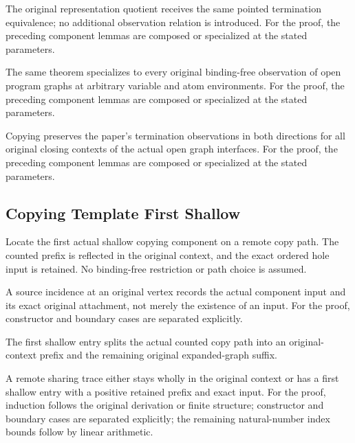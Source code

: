 The original representation quotient receives the same pointed termination equivalence; no additional observation relation is introduced.
For the proof, the preceding component lemmas are composed or specialized at the stated parameters.
\par{}

The same theorem specializes to every original binding-free observation of open program graphs at arbitrary variable and atom environments.
For the proof, the preceding component lemmas are composed or specialized at the stated parameters.
\par{}

Copying preserves the paper's termination observations in both directions for all original closing contexts of the actual open graph interfaces.
For the proof, the preceding component lemmas are composed or specialized at the stated parameters.
\par{}

\subsection{Copying Template First Shallow}
Locate the first actual shallow copying component on a remote copy path. The counted prefix is reflected in the original context, and the exact ordered hole input is retained. No binding-free restriction or path choice is assumed.

A source incidence at an original vertex records the actual component input and its exact original attachment, not merely the existence of an input.
For the proof, constructor and boundary cases are separated explicitly.
\par{}

The first shallow entry splits the actual counted copy path into an original-context prefix and the remaining original expanded-graph suffix.
\par{}

A remote sharing trace either stays wholly in the original context or has a first shallow entry with a positive retained prefix and exact input.
For the proof, induction follows the original derivation or finite structure; constructor and boundary cases are separated explicitly; the remaining natural-number index bounds follow by linear arithmetic.
\par{}

